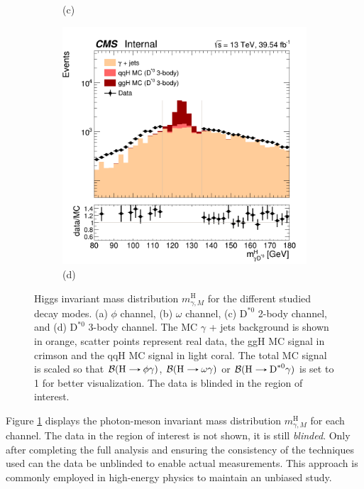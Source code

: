 \begin{figure}[!ht]
\begin{subfigure}[t]{0.50\mylength}
        \vspace*{-0.2cm}
        \caption{\footnotesize (c)}
    \end{subfigure}%
    \begin{subfigure}[t]{0.50\mylength}
        \centering
        \includegraphics[width=0.49\mylength]{resources/plots/D0Star_3body_HiggsMass.png}
        \vspace*{-0.2cm}
        \caption{\footnotesize (d)}
    \end{subfigure}%
\caption{Higgs invariant mass distribution $m^{\text{H}}_{\gamma, M}$ for the different studied decay modes. (a) $\phi$ channel, (b) $\omega$ channel, (c) $\text{D}^{*0}$ 2-body channel, and (d) $\text{D}^{*0}$ 3-body channel. The MC $\gamma$ + jets background is shown in orange, scatter points represent real data, the ggH MC signal in crimson and the qqH MC signal in light coral. The total MC signal is scaled so that $\mathcal{B}(\text{H}\protect\decaysto \phi\gamma)$, $\mathcal{B}(\text{H}\protect\decaysto \omega\gamma)$ or $\mathcal{B}(\text{H}\protect\decaysto \text{D}^{*0}\gamma)$ is set to 1 for better visualization. The data is blinded in the region of interest.}
\label{fig:Higgs_mass_data}
    \vspace*{-0.0cm}
\end{figure}
Figure \ref{fig:Higgs_mass_data} displays the photon-meson invariant mass distribution $m^{\text{H}}_{\gamma, M}$ for each channel. The data in the region of interest is not shown, it is still \textit{blinded}. Only after completing the full analysis and ensuring the consistency of the techniques used can the data be unblinded to enable actual measurements. This approach is commonly employed in high-energy physics to maintain an unbiased study.

